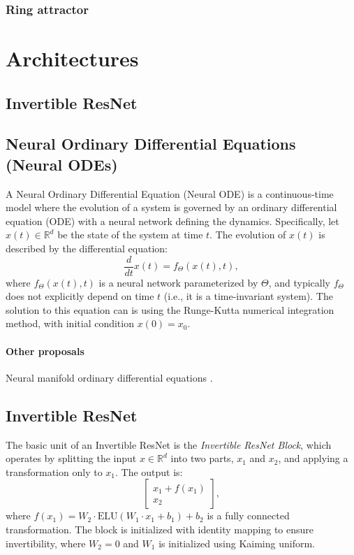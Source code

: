 \documentclass{article}
\theoremstyle{definition} \newtheorem{definition}{Definition}  \newtheorem{example}{Example}
\theoremstyle{remark} \newtheorem{remark}{Remark}
\newcounter{ct}
\begin{document}
\subsubsection{Ring attractor}


\newpage
\section{Architectures}

\subsection{Invertible ResNet}




\subsection{Neural Ordinary Differential Equations (Neural ODEs)}
\citep{chen2018neural,massaroli2020dissecting}
A Neural Ordinary Differential Equation (Neural ODE) is a continuous-time model where the evolution of a system is governed by an ordinary differential equation (ODE) with a neural network defining the dynamics. Specifically, let \( x(t) \in \mathbb{R}^d \) be the state of the system at time \( t \). The evolution of \( x(t) \) is described by the differential equation:
\begin{equation}
    \frac{d}{dt} x(t) = f_\Theta(x(t), t),
\end{equation}
where \( f_\Theta(x(t), t) \) is a neural network parameterized by \( \Theta \), and typically \( f_\Theta \) does not explicitly depend on time \( t \) (i.e., it is a time-invariant system).
 The solution to this equation can is using the Runge-Kutta numerical integration method, with initial condition \( x(0) = x_0 \).

\paragraph{Other proposals}
Neural manifold ordinary differential equations \citep{lou2020neural}.

\subsection{Invertible ResNet}
The basic unit of an Invertible ResNet is the \textit{Invertible ResNet Block}, which operates by splitting the input \( x \in \mathbb{R}^d \) into two parts, \( x_1 \) and \( x_2 \), and applying a transformation only to \( x_1 \). The output is:
\[
 \begin{bmatrix} x_1 + f(x_1) \\ x_2 \end{bmatrix},
\]
where \( f(x_1) = W_2 \cdot \text{ELU}(W_1 \cdot x_1 + b_1) + b_2 \) is a fully connected transformation. %
The block is initialized with identity mapping to ensure invertibility, where \( W_2 = 0 \) and \( W_1 \) is initialized using Kaiming uniform.
\end{document}
